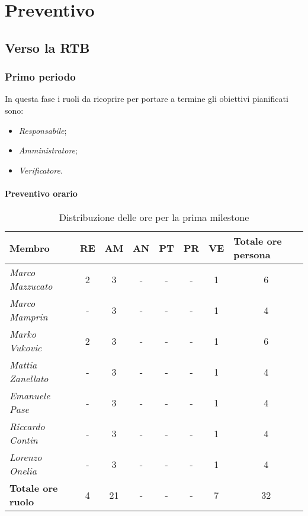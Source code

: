 \chapter{Preventivo}

\section{Verso la RTB}

\subsection{Primo periodo}

In questa fase i ruoli da ricoprire per portare a termine gli obiettivi
pianificati sono:
\begin{itemize}
    \item \textit{Responsabile};
    \item \textit{Amministratore};
    \item \textit{Verificatore}.
\end{itemize}

\subsubsection{Preventivo orario}

\begin{table}[!ht]
    \centering
    \begin{tabular}{|l|c|c|c|c|c|c|c|}
    \hline
    \textbf{Membro} & \multicolumn{1}{l|}{\textbf{RE}} & \multicolumn{1}{l|}{\textbf{AM}} & \multicolumn{1}{l|}{\textbf{AN}} & \multicolumn{1}{l|}{\textbf{PT}} & \multicolumn{1}{l|}{\textbf{PR}} & \multicolumn{1}{l|}{\textbf{VE}} & \multicolumn{1}{l|}{\textbf{Totale ore persona}} \\ \hline
    \textit{Marco Mazzucato}  & 2 & 3  & - & - & - & 1 & 6  \\ \hline
    \textit{Marco Mamprin}    & - & 3  & - & - & - & 1 & 4  \\ \hline
    \textit{Marko Vukovic}    & 2 & 3  & - & - & - & 1 & 6  \\ \hline
    \textit{Mattia Zanellato} & - & 3  & - & - & - & 1 & 4  \\ \hline
    \textit{Emanuele Pase}    & - & 3  & - & - & - & 1 & 4  \\ \hline
    \textit{Riccardo Contin}  & - & 3  & - & - & - & 1 & 4  \\ \hline
    \textit{Lorenzo Onelia}   & - & 3  & - & - & - & 1 & 4  \\ \hline
    \textbf{Totale ore ruolo} & 4 & 21 & - & - & - & 7 & 32 \\ \hline
    \end{tabular}
    \caption{Distribuzione delle ore per la prima milestone}
\end{table}

